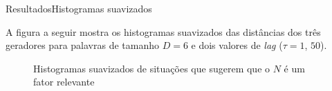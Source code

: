 \documentclass[10pt,xcolor={dvipsnames}]{beamer}
\begin{document}
\begin{frame}{Resultados}{Histogramas suavizados}
\begin{block}{}
	A figura a seguir mostra os histogramas suavizados das distâncias dos três geradores para palavras de tamanho $D=6$ e dois valores de \textit{lag} ($\tau=1$, $50$).
	
	\begin{figure} %
		\centering
		\caption{Histogramas suavizados de situações que sugerem que o $N$ é um fator relevante}\label{fig:NRelevante}
	\end{figure}
\end{block}
\end{frame}
\end{document}
